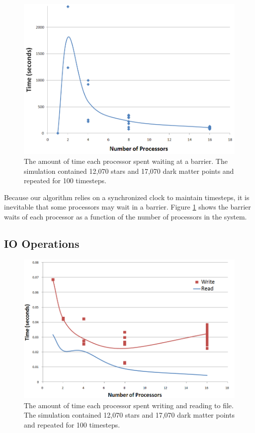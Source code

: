 \documentclass{article}
\begin{document}
\begin{figure}
\centering
\includegraphics[width=\columnwidth]{barrier-runtimes.png}
\caption{The amount of time each processor spent waiting at a barrier. The simulation contained 12,070 stars and 17,070 dark matter points and repeated for 100 timesteps. \label{fig:barrier-runtimes}}
\end{figure} 

Because our algorithm relies on a synchronized clock to maintain timesteps, it is inevitable that some processors may wait in a barrier.  Figure \ref{fig:barrier-runtimes} shows the barrier waits of each processor as a function of the number of processors in the system. 

\subsection{IO Operations}

\begin{figure}
\centering
\includegraphics[width=\columnwidth]{io-runtimes.png}
\caption{The amount of time each processor spent writing and reading to file. The simulation contained 12,070 stars and 17,070 dark matter points and repeated for 100 timesteps. \label{fig:io-runtimes}}
\end{figure} 
\end{document}
